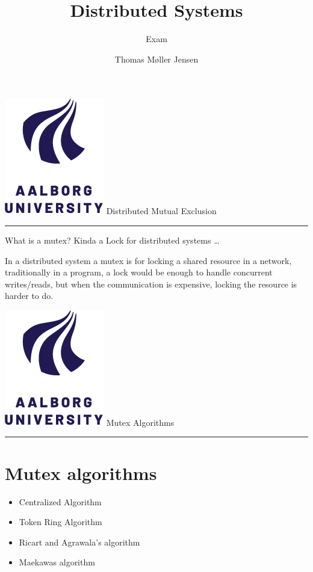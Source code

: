 \documentclass[aspectratio=1610,17pt,utf8]{beamer}
\title[DS]{Distributed Systems}
\subtitle{Exam}
\author[Thomas Møller Jensen]{Thomas Møller Jensen}
\institute[Institute of Computer Science]
{
  Aalborg University\\
}
\newcommand{\mainframe}[1]{\color{blue} \includegraphics[width=.05\textwidth]{figures/aau.png} #1\\\color{black}\hrule}
\newcommand{\regularframe}[1]{\color{black}\includegraphics[width=.05\textwidth]{figures/aau.png} #1\\\hrule}
\begin{document}

\begin{frame}{\mainframe{Distributed Mutual Exclusion}}
    What is a mutex? Kinda a Lock for distributed systems \ldots

    In a distributed system a mutex is for locking a shared resource in a network, traditionally in a program, a lock would be enough to handle concurrent writes/reads, but when the communication is expensive, locking the resource is harder to do.
\end{frame}


\begin{frame}{\regularframe{Mutex Algorithms}}
    \section{Mutex algorithms}
    \begin{itemize}
        \item Centralized Algorithm
        \item Token Ring Algorithm
        \item Ricart and Agrawala's algorithm
        \item Maekawas algorithm
    \end{itemize}
\end{frame}

\end{document}
